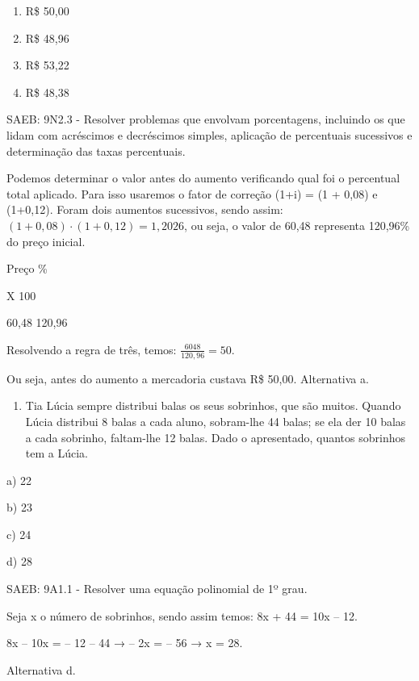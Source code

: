 \begin{escolha}
\begin{escolha}
\begin{escolha}
\begin{escolha}
{\begin{boxmedio}
\begin{boxpeq}
\begin{q°}
\begin{boxmedio}
\begin{boxpeq}
\begin{boxpeq}
\begin{boxmedio}
\begin{boxmedio}
\begin{boxmedio}
\begin{largebox}
\begin{boxmedio}
{\begin{escolha}
\begin{escolha}
\begin{escolha}
\begin{escolha}
\begin{escolha}
\begin{escolha}
{\begin{enumerate}

\item
  R\$ 50,00
\item
  R\$ 48,96
\item
  R\$ 53,22
\item
  R\$ 48,38
\end{enumerate}

SAEB: 9N2.3 - Resolver problemas que envolvam porcentagens, incluindo os
que lidam com acréscimos e decréscimos simples, aplicação de percentuais
sucessivos e determinação das taxas percentuais.

Podemos determinar o valor antes do aumento verificando qual foi o
percentual total aplicado. Para isso usaremos o fator de correção (1+i)
= (1 + 0,08) e (1+0,12). Foram dois aumentos sucessivos, sendo assim:
$\left( 1 + 0,08 \right) \cdot \left( 1 + 0,12 \right) = 1,2026$, ou
seja, o valor de 60,48 representa 120,96\% do preço inicial.

Preço \%

X 100

60,48 120,96

Resolvendo a regra de três, temos: $\frac{6048}{120,96} = 50$.

Ou seja, antes do aumento a mercadoria custava R\$ 50,00. Alternativa a.

\begin{enumerate}
\num{\arabic{enumi}.}
\setcounter{enumi}{4}
\tightlist
\item
  Tia Lúcia sempre distribui balas os seus sobrinhos, que são muitos.
  Quando Lúcia distribui 8 balas a cada aluno, sobram-lhe 44 balas; se
  ela der 10 balas a cada sobrinho, faltam-lhe 12 balas. Dado o
  apresentado, quantos sobrinhos tem a Lúcia.
\end{enumerate}

a) 22

b) 23

c) 24

d) 28

SAEB: 9A1.1 - Resolver uma equação polinomial de 1º grau.

Seja x o número de sobrinhos, sendo assim temos: 8x + 44 = 10x -- 12.

8x -- 10x = -- 12 -- 44 → -- 2x = -- 56 → x = 28.

Alternativa d.

}
\end{escolha}
\end{escolha}
\end{escolha}
\end{escolha}
\end{escolha}
\end{escolha}}
\end{boxmedio}
\end{largebox}
\end{boxmedio}
\end{boxmedio}
\end{boxmedio}
\end{boxpeq}
\end{boxpeq}
\end{boxmedio}
\end{q°}
\end{boxpeq}
\end{boxmedio}}
\end{escolha}
\end{escolha}
\end{escolha}
\end{escolha}
